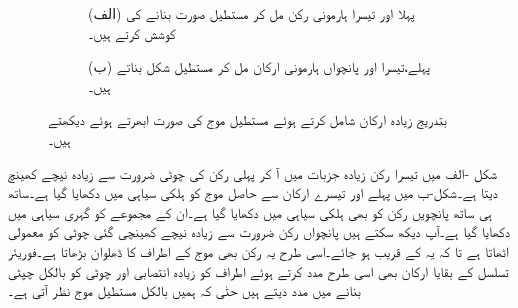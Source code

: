 \begin{figure}
\centering
\begin{subfigure}{0.5\textwidth}
\centering
{}
\caption*{(الف) پہلا اور تیسرا ہارمونی رکن مل کر مستطیل صورت بنانے کی کوشش کرتے ہیں۔}
\end{subfigure}%
\begin{subfigure}{0.5\textwidth}
\centering
{}
\caption*{(ب) پہلے،تیسرا اور پانچواں ہارمونی ارکان مل کر مستطیل شکل بناتے ہیں۔}
\end{subfigure}
\caption{بتدریج زیادہ ارکان شامل کرتے ہوئے مستطیل موج کی صورت ابھرتے ہوئے دیکھتے ہیں۔}
\label{شکل_فوریئر_ابھرتا_مستطیل}
\end{figure}

شکل -الف میں تیسرا رکن زیادہ جزبات میں آ کر پہلی رکن کی چوٹی ضرورت سے زیادہ نیچے کھینچ  دیتا ہے۔شکل-ب میں پہلے اور تیسرے ارکان سے حاصل موج کو ہلکی سیاہی میں دکھایا گیا ہے۔ساتھ ہی ساتھ پانچویں رکن کو بھی ہلکی سیاہی میں دکھایا گیا ہے۔ان کے مجموعے کو گہری سیاہی میں دکھایا گیا ہے۔آپ دیکھ سکتے ہیں پانچواں رکن ضرورت سے زیادہ نیچے کھینچی گئی چوٹی کو معمولی اٹھاتا ہے تا کہ یہ  کے قریب ہو جائے۔اسی طرح یہ رکن بھی موج کے اطراف کا ڈھلوان بڑھاتا ہے۔فوریئر تسلسل کے بقایا ارکان بھی اسی طرح مدد کرتے ہوئے اطراف کو زیادہ  انتصابی  اور چوٹی کو بالکل چپٹی بنانے میں مدد دیتے ہیں حتٰی کہ ہمیں بالکل مستطیل موج نظر آتی ہے۔

